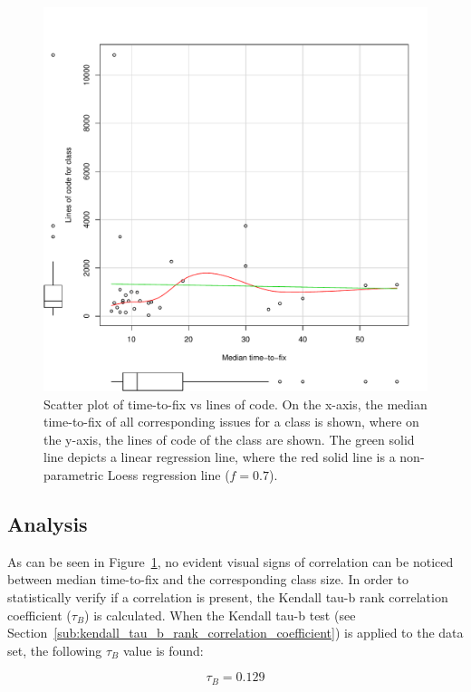 \begin{figure}[!ht]
	\centering
		\includegraphics[width=1\textwidth]{img/ttf-classes-loc.pdf}
	\caption{Scatter plot of time-to-fix vs lines of code. On the x-axis, the median time-to-fix of all corresponding issues for a class is shown, where on the y-axis, the lines of code of the class are shown. The green solid line depicts a linear regression line, where the red solid line is a non-parametric Loess regression line ($f = 0.7$).}
	\label{fig:ttf_loc_scatter}
\end{figure}


\subsection{Analysis} %
As can be seen in Figure~\ref{fig:ttf_loc_scatter}, no evident visual signs of correlation can be noticed between median time-to-fix and the corresponding class size. In order to statistically verify if a correlation is present, the Kendall tau-b rank correlation coefficient ($\tau_B$) is calculated. When the Kendall tau-b test (see Section~\ref{sub:kendall_tau_b_rank_correlation_coefficient}) is applied to the data set, the following $\tau_B$ value is found:

\begin{equation}
	\tau_B = 0.129
\end{equation}

